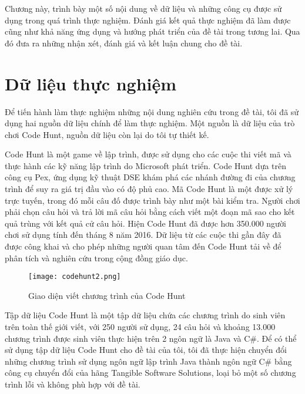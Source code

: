 Chương này,  trình bày một số nội dung về dữ liệu và những công cụ được sử dụng trong quá trình thực nghiệm. Đánh giá kết quả thực nghiệm đã làm được cũng như khả năng ứng dụng và hướng phát triển của đề tài trong tương lai. Qua đó đưa ra những nhận xét, đánh giá và kết luận chung cho đề tài.

\section{Dữ liệu thực nghiệm}
Để tiến hành làm thực nghiệm những nội dung nghiên cứu trong đề tài, tôi đã sử dụng hai nguồn dữ liệu chính để làm thực nghiệm. Một nguồn là dữ liệu của trò chơi Code Hunt, nguồn dữ liệu còn lại do tôi tự thiết kế.

Code Hunt \cite{CodeHunt} là một game về lập trình, được sử dụng cho các cuộc thi viết mã và thực hành các kỹ năng lập trình do Microsoft phát triển. Code Hunt dựa trên công cụ Pex, ứng dụng kỹ thuật DSE khám phá các nhánh đường đi của chương trình để suy ra giá trị đầu vào có độ phủ cao. Mã Code Hunt là một được xử lý trực tuyến, trong đó mỗi câu đố được trình bày như một bài kiểm tra. Người chơi phải chọn câu hỏi và trả lời mã câu hỏi bằng cách viết một đoạn mã sao cho kết quả trùng với kết quả cử câu hỏi. Hiện Code Hunt đã được hơn 350.000 người chơi sử dụng tính đến tháng 8 năm 2016. Dữ liệu từ các cuộc thi gần đây đã được công khai và cho phép những người quan tâm đến Code Hunt tải về để phân tích và nghiên cứu trong cộng đồng giáo dục.

\label{sec:data}
\begin{center}
	\begin{figure}[H]
		\begin{center}
			\texttt{[image: codehunt2.png]}
		\end{center}
		\caption{Giao diện viết chương trình của Code Hunt}
		\label{codehunt2}
	\end{figure}
\end{center}

Tập dữ liệu Code Hunt là một tập dữ liệu chứa các chương trình do sinh viên trên toàn thế giới viết, với 250 người sử dụng, 24 câu hỏi và khoảng 13.000 chương trình được sinh viên thực hiện trên 2 ngôn ngữ là Java và C\#. Để có thể sử dụng tập dữ liệu Code Hunt cho đề tài của tôi, tôi đã thực hiện chuyển đổi những chương trình sử dụng ngôn ngữ lập trình Java thành ngôn ngữ C\# bằng công cụ chuyển đổi của hãng Tangible Software Solutions, loại bỏ một số chương trình lỗi và không phù hợp với đề tài.

